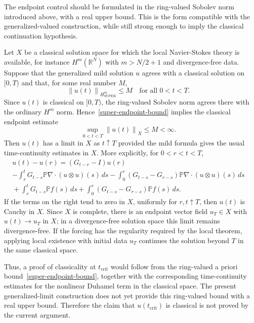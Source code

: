 \documentclass{amsart}
\DeclareMathOperator{\SUPER}{SUPER}
\newcommand{\norm}[1]{\left\lVert #1\right\rVert}
\begin{document}
The endpoint control should be formulated in the ring-valued Sobolev norm
introduced above, with a real upper bound.  This is the form compatible with
the generalized-valued construction, while still strong enough to imply the
classical continuation hypothesis.

Let $X$ be a classical solution space for which the local Na\-vi\-er-Sto\-kes
theory is available, for instance $H^m(\mathbb{R}^N)$ with
$m>N/2+1$ and divergence-free data.  Suppose that the generalized mild solution
$u$ agrees with a classical solution on $[0,T)$ and that, for some real number
$M$,
\begin{equation}\label{super-endpoint-bound}
  \norm{u(t)}_{H^m_{\SUPER}}\leq M
  \quad\text{for all }0<t<T .
\end{equation}
Since $u(t)$ is classical on $[0,T)$, the ring-valued Sobolev norm agrees there
with the ordinary $H^m$ norm.  Hence~\eqref{super-endpoint-bound} implies the
classical endpoint estimate
\begin{equation}\label{endpoint-bound}
  \sup_{0<t<T}\norm{u(t)}_X \leq M < \infty .
\end{equation}
Then $u(t)$ has a limit in $X$ as $t\uparrow T$ provided the mild formula gives
the usual time-continuity estimates in $X$.  More explicitly, for
$0<r<t<T$,
\begin{multline*}
u(t)-u(r)
= (G_{t-r}-I)u(r) \\
-\int_r^tG_{t-s}\mathbb{P}\nabla\cdot(u\otimes u)(s)\,ds
-\int_0^r(G_{t-s}-G_{r-s})\mathbb{P}\nabla\cdot(u\otimes u)(s)\,ds \\
{}+\int_r^tG_{t-s}\mathbb{P}f(s)\,ds
{}+\int_0^r(G_{t-s}-G_{r-s})\mathbb{P}f(s)\,ds .
\end{multline*}
If the terms on the right tend to zero in $X$, uniformly for $r,t\uparrow T$,
then $u(t)$ is Cauchy in $X$.  Since $X$ is complete, there is an endpoint
vector field $u_T\in X$ with $u(t)\to u_T$ in $X$; in a divergence-free
solution space this limit remains divergence-free.  If the forcing has the
regularity required by the local theorem, applying local existence with
initial data $u_T$ continues the solution beyond $T$ in the same classical
space.

Thus, a proof of classicality at $t_{\operatorname{crit}}$ would
follow from the ring-valued a priori bound~\eqref{super-endpoint-bound},
together with the corresponding time-continuity estimates for the nonlinear
Duhamel term in the classical space.  The present generalized-limit
construction does not yet provide this ring-valued bound with a real upper
bound.  Therefore the claim that $u(t_{\operatorname{crit}})$ is classical is
not proved by the current argument.
\end{document}
